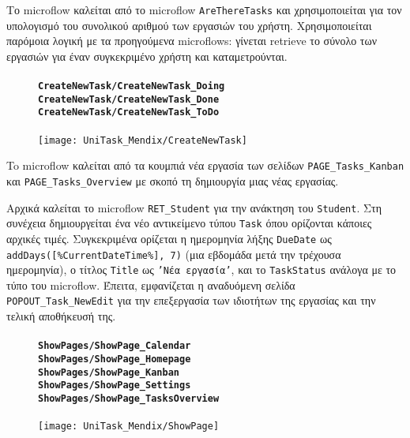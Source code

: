                 Το microflow καλείται από το microflow \texttt{AreThereTasks} και χρησιμοποιείται για τον υπολογισμό του συνολικού αριθμού των εργασιών του χρήστη. Χρησιμοποιείται παρόμοια λογική με τα προηγούμενα microflows: γίνεται retrieve το σύνολο των εργασιών για έναν συγκεκριμένο χρήστη και καταμετρούνται.

                \begin{figure}[H] \noindent
                    \paragraph{\texttt{CreateNewTask/CreateNewTask\_Doing} \\ \texttt{CreateNewTask/CreateNewTask\_Done} \\ \texttt{CreateNewTask/CreateNewTask\_ToDo}}
                    \begin{center}
                        \texttt{[image: UniTask\_Mendix/CreateNewTask]}
                    \end{center}
                \end{figure}

                To microflow καλείται από τα κουμπιά {\Zona νέα εργασία} των σελίδων \texttt{PAGE\_Tasks\_Kanban} και \texttt{PAGE\_Tasks\_Overview} με σκοπό τη δημιουργία μιας νέας εργασίας.

                Αρχικά καλείται το microflow \texttt{RET\_Student} για την ανάκτηση του \texttt{Student}. Στη συνέχεια δημιουργείται ένα νέο αντικείμενο τύπου \texttt{Task} όπου ορίζονται κάποιες αρχικές τιμές. Συγκεκριμένα ορίζεται η ημερομηνία λήξης \texttt{DueDate} ως \linebreak \verb|addDays([%CurrentDateTime%], 7)| (μια εβδομάδα μετά την τρέχουσα ημερομηνία), ο τίτλος \texttt{Title} ως \texttt{'Νέα εργασία'}, και το \texttt{TaskStatus} ανάλογα με το τύπο του microflow. Έπειτα, εμφανίζεται η αναδυόμενη σελίδα \texttt{POPOUT\_Task\_NewEdit} για την επεξεργασία των ιδιοτήτων της εργασίας και την τελική αποθήκευσή της.

                \begin{figure}[H] \noindent
                    \paragraph{\texttt{ShowPages/ShowPage\_Calendar} \\ \texttt{ShowPages/ShowPage\_Homepage} \\ \texttt{ShowPages/ShowPage\_Kanban} \\ \texttt{ShowPages/ShowPage\_Settings} \\ \texttt{ShowPages/ShowPage\_TasksOverview}}
                    \begin{center}
                        \texttt{[image: UniTask\_Mendix/ShowPage]}
                    \end{center}
                \end{figure}

